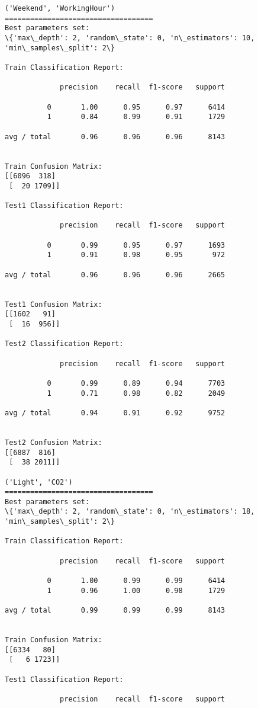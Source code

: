 \documentclass[11pt]{article}
\begin{document}
    \begin{Verbatim}[commandchars=\\\{\}]
('Weekend', 'WorkingHour')
===================================
Best parameters set:
\{'max\_depth': 2, 'random\_state': 0, 'n\_estimators': 10, 'min\_samples\_split': 2\}

Train Classification Report:

             precision    recall  f1-score   support

          0       1.00      0.95      0.97      6414
          1       0.84      0.99      0.91      1729

avg / total       0.96      0.96      0.96      8143


Train Confusion Matrix:
[[6096  318]
 [  20 1709]]

Test1 Classification Report:

             precision    recall  f1-score   support

          0       0.99      0.95      0.97      1693
          1       0.91      0.98      0.95       972

avg / total       0.96      0.96      0.96      2665


Test1 Confusion Matrix:
[[1602   91]
 [  16  956]]

Test2 Classification Report:

             precision    recall  f1-score   support

          0       0.99      0.89      0.94      7703
          1       0.71      0.98      0.82      2049

avg / total       0.94      0.91      0.92      9752


Test2 Confusion Matrix:
[[6887  816]
 [  38 2011]]

('Light', 'CO2')
===================================
Best parameters set:
\{'max\_depth': 2, 'random\_state': 0, 'n\_estimators': 18, 'min\_samples\_split': 2\}

Train Classification Report:

             precision    recall  f1-score   support

          0       1.00      0.99      0.99      6414
          1       0.96      1.00      0.98      1729

avg / total       0.99      0.99      0.99      8143


Train Confusion Matrix:
[[6334   80]
 [   6 1723]]

Test1 Classification Report:

             precision    recall  f1-score   support


\end{Verbatim}
\end{document}
